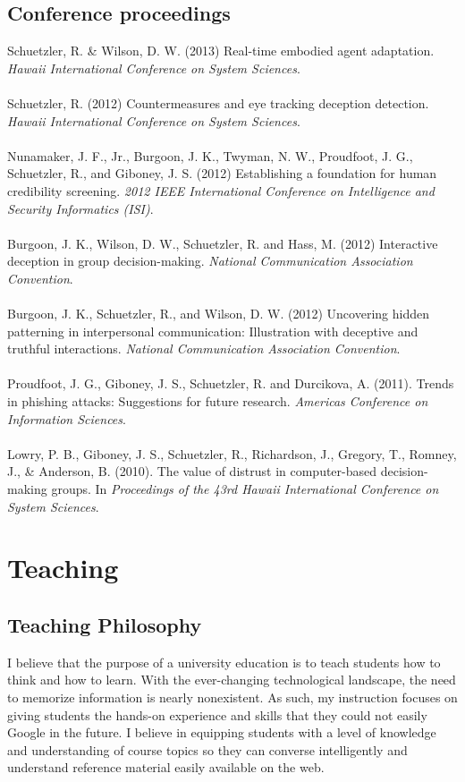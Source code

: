\documentclass[10pt, a4paper]{article}
\newcommand{\years}[1]{\marginnote{\scriptsize #1}}
\begin{document}
\subsection*{Conference proceedings}
\noindent
\years{2013}Schuetzler, R. \& Wilson, D. W. (2013) Real-time embodied agent adaptation. \emph{Hawaii International Conference on System Sciences}.\\\\
\years{2012}Schuetzler, R. (2012) Countermeasures and eye tracking deception
detection. \emph{Hawaii International Conference on System Sciences}.\\\\
Nunamaker, J. F., Jr., Burgoon, J. K., Twyman, N. W., Proudfoot, J. G.,
Schuetzler, R., and Giboney, J. S. (2012) Establishing a foundation for human
credibility screening. \emph{2012 IEEE International Conference on Intelligence
  and Security Informatics (ISI)}.\\\\
Burgoon, J. K., Wilson, D. W., Schuetzler, R. and Hass, M. (2012) Interactive deception in group decision-making. \emph{National Communication Association Convention}.\\\\
Burgoon, J. K., Schuetzler, R., and Wilson, D. W. (2012) Uncovering hidden patterning in interpersonal communication: Illustration with deceptive and truthful interactions. \emph{National Communication Association Convention}.\\\\
\years{2011}Proudfoot, J. G., Giboney, J. S., Schuetzler, R. and Durcikova, A. (2011). Trends in phishing attacks: Suggestions for future research. \emph{Americas Conference on Information Sciences}.\\\\
\years{2010}Lowry, P. B., Giboney, J. S., Schuetzler, R., Richardson, J., Gregory, T., Romney, J., \& Anderson, B. (2010). The value of distrust in computer-based decision-making groups. In \emph{Proceedings of the 43rd Hawaii International Conference on System Sciences}.\\

\section*{Teaching}

\subsection*{Teaching Philosophy}
I believe that the purpose of a university education is to teach students how to
think and how to learn. With the ever-changing technological landscape, the need
to memorize information is nearly nonexistent. As such, my instruction focuses
on giving students the hands-on experience and skills that they could not easily
Google in the future. I believe in equipping students with a level of knowledge
and understanding of course topics so they can converse intelligently and
understand reference material easily available on the web.\\
\end{document}
